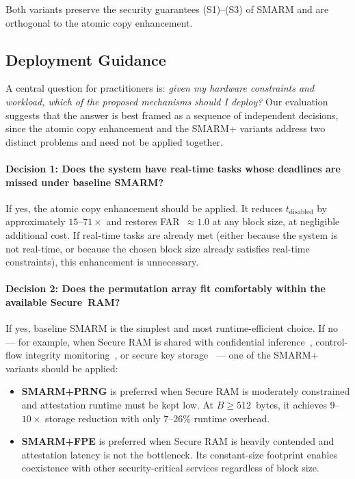 \documentclass[a4paper,10pt]{article}
\begin{document}
{Both variants preserve the security guarantees (S1)--(S3) of 
SMARM and are orthogonal to the atomic copy enhancement.

\subsection{Deployment Guidance}
\label{sec:deployment-guidance}

A central question for practitioners is: \emph{given my hardware 
constraints and workload, which of the proposed mechanisms 
should I deploy?} Our evaluation suggests that the answer is 
best framed as a sequence of independent decisions, since the 
atomic copy enhancement and the SMARM+ variants address two 
distinct problems and need not be applied together.

\paragraph{Decision 1: Does the system have real-time tasks 
whose deadlines are missed under baseline SMARM?}
If yes, the atomic copy enhancement should be applied. It 
reduces $t_{\mathrm{disabled}}$ by approximately 
$15$--$71\times$ and restores FAR~$\approx 1.0$ at any block 
size, at negligible additional cost. If real-time tasks are 
already met (either because the system is not real-time, or 
because the chosen block size already satisfies real-time 
constraints), this enhancement is unnecessary.

\paragraph{Decision 2: Does the permutation array fit comfortably 
within the available Secure~RAM?}
If yes, baseline SMARM is the simplest and most 
runtime-efficient choice. If no — for example, when Secure RAM 
is shared with confidential 
inference~\cite{islam2023confidential}, control-flow integrity 
monitoring~\cite{kawada2021tzmcfi}, or secure key 
storage~\cite{silabs2020an1271} — one of the SMARM+ variants 
should be applied:

\begin{itemize}
    \item \textbf{SMARM+PRNG} is preferred when 
    Secure RAM is moderately constrained and attestation runtime 
    must be kept low. At $B \geq 512$~bytes, it achieves 
    $9$--$10\times$ storage reduction with only $7$--$26\%$ 
    runtime overhead.
    
    \item \textbf{SMARM+FPE} is preferred when 
    Secure RAM is heavily contended and attestation latency is 
    not the bottleneck. Its constant-size footprint enables 
    coexistence with other security-critical services regardless 
    of block size.
\end{itemize}

}
\end{document}
